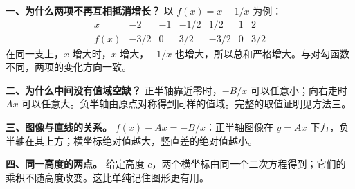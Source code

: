 \begin{explanationbox}
\textbf{一、为什么两项不再互相抵消增长？} 以 $f(x)=x-1/x$ 为例：
\[
\begin{array}{c|rrrrrr}x&-2&-1&-1/2&1/2&1&2\\\hline f(x)&-3/2&0&3/2&-3/2&0&3/2\end{array}
\]
在同一支上，$x$ 增大时，$x$ 增大，$-1/x$ 也增大，所以总和严格增大。与对勾函数不同，两项的变化方向一致。

\textbf{二、为什么中间没有值域空缺？} 正半轴靠近零时，$-B/x$ 可以任意小；向右走时 $Ax$ 可以任意大。负半轴由原点对称得到同样的值域。完整的取值证明见方法三。

\textbf{三、图像与直线的关系。} $f(x)-Ax=-B/x$：正半轴图像在 $y=Ax$ 下方，负半轴在其上方；横坐标绝对值越大，竖直差的绝对值越小。

\textbf{四、同一高度的两点。} 给定高度 $c$，两个横坐标由同一个二次方程得到；它们的乘积不随高度改变。这比单纯记住图形更有用。
\end{explanationbox}
